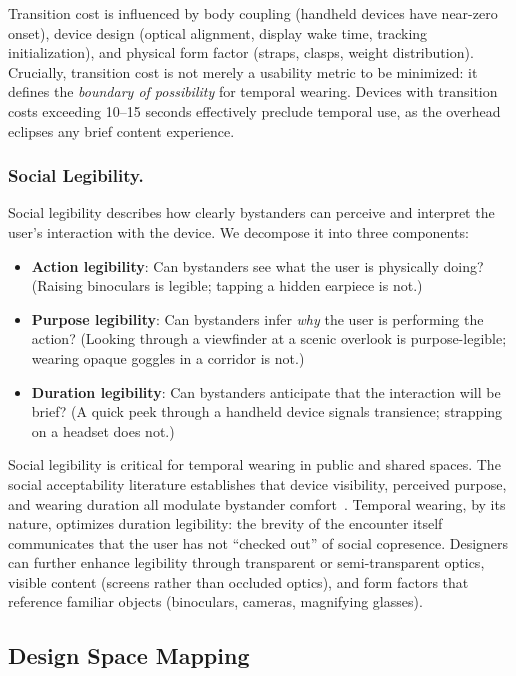 Transition cost is influenced by body coupling (handheld devices have near-zero onset), device design (optical alignment, display wake time, tracking initialization), and physical form factor (straps, clasps, weight distribution). Crucially, transition cost is not merely a usability metric to be minimized: it defines the \textit{boundary of possibility} for temporal wearing. Devices with transition costs exceeding 10--15 seconds effectively preclude temporal use, as the overhead eclipses any brief content experience.

\subsubsection{Social Legibility.}
Social legibility describes how clearly bystanders can perceive and interpret the user's interaction with the device. We decompose it into three components:
\begin{itemize}
    \item \textbf{Action legibility}: Can bystanders see what the user is physically doing? (Raising binoculars is legible; tapping a hidden earpiece is not.)
    \item \textbf{Purpose legibility}: Can bystanders infer \textit{why} the user is performing the action? (Looking through a viewfinder at a scenic overlook is purpose-legible; wearing opaque goggles in a corridor is not.)
    \item \textbf{Duration legibility}: Can bystanders anticipate that the interaction will be brief? (A quick peek through a handheld device signals transience; strapping on a headset does not.)
\end{itemize}

Social legibility is critical for temporal wearing in public and shared spaces. The social acceptability literature establishes that device visibility, perceived purpose, and wearing duration all modulate bystander comfort~\cite{koelle2020social, profita2013wrist}. Temporal wearing, by its nature, optimizes duration legibility: the brevity of the encounter itself communicates that the user has not ``checked out'' of social copresence. Designers can further enhance legibility through transparent or semi-transparent optics, visible content (screens rather than occluded optics), and form factors that reference familiar objects (binoculars, cameras, magnifying glasses).


\subsection{Design Space Mapping}

